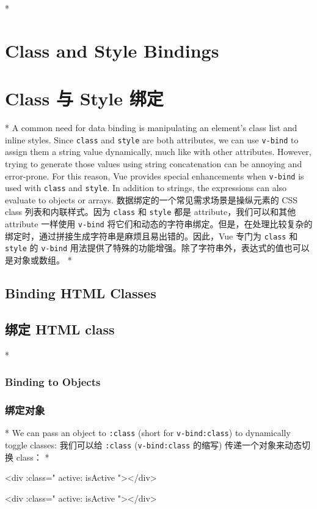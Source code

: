 \begin{paracol}{2}

\switchcolumn[0]*%
\section{Class and Style Bindings}
\switchcolumn
\section{Class 与 Style 绑定}
\switchcolumn[0]*%
A common need for data binding is manipulating an element's class list
and inline styles. Since \texttt{class} and \texttt{style} are both
attributes, we can use \texttt{v-bind} to assign them a string value
dynamically, much like with other attributes. However, trying to
generate those values using string concatenation can be annoying and
error-prone. For this reason, Vue provides special enhancements when
\texttt{v-bind} is used with \texttt{class} and \texttt{style}. In
addition to strings, the expressions can also evaluate to objects or
arrays.
\switchcolumn
数据绑定的一个常见需求场景是操纵元素的 CSS class 列表和内联样式。因为
\texttt{class} 和 \texttt{style} 都是 attribute，我们可以和其他
attribute 一样使用 \texttt{v-bind}
将它们和动态的字符串绑定。但是，在处理比较复杂的绑定时，通过拼接生成字符串是麻烦且易出错的。因此，Vue
专门为 \texttt{class} 和 \texttt{style} 的 \texttt{v-bind}
用法提供了特殊的功能增强。除了字符串外，表达式的值也可以是对象或数组。
\switchcolumn[0]*%
\subsection{Binding HTML Classes}
\switchcolumn
\subsection{绑定 HTML class}
\switchcolumn[0]*%
\subsubsection{Binding to Objects}
\switchcolumn
\subsubsection{绑定对象}
\switchcolumn[0]*%
We can pass an object to \texttt{:class} (short for
\texttt{v-bind:class}) to dynamically toggle classes:
\switchcolumn
我们可以给 \texttt{:class} (\texttt{v-bind:class} 的缩写)
传递一个对象来动态切换 class：
\switchcolumn[0]*%
\begin{codeHtml}
<div :class="{ active: isActive }"></div>
\end{codeHtml}
\switchcolumn
\begin{codeHtml}
<div :class="{ active: isActive }"></div>
\end{codeHtml}


\end{paracol}

